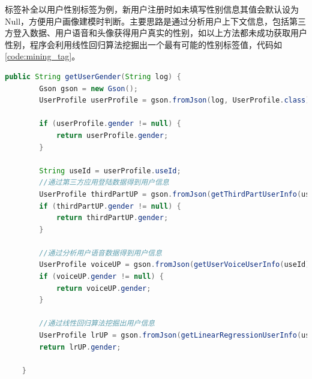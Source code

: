   标签补全以用户性别标签为例，新用户注册时如未填写性别信息其值会默认设为Null，方便用户画像建模时判断。主要思路是通过分析用户上下文信息，包括第三方登入数据、用户语音和头像获得用户真实的性别，如以上方法都未成功获取用户性别，程序会利用线性回归算法挖掘出一个最有可能的性别标签值，代码如\autoref{code:mining_tag}。
  \begin{lstlisting}[language=java,firstnumber=1,label={code:mining_tag}, caption={标签补全算法}]
    public String getUserGender(String log) {
        Gson gson = new Gson();
        UserProfile userProfile = gson.fromJson(log, UserProfile.class);

        if (userProfile.gender != null) {
            return userProfile.gender;
        }

        String useId = userProfile.useId;
        //通过第三方应用登陆数据得到用户信息
        UserProfile thirdPartUP = gson.fromJson(getThirdPartUserInfo(useId), UserProfile.class);
        if (thirdPartUP.gender != null) {
            return thirdPartUP.gender;
        }

        //通过分析用户语音数据得到用户信息
        UserProfile voiceUP = gson.fromJson(getUserVoiceUserInfo(useId), UserProfile.class);
        if (voiceUP.gender != null) {
            return voiceUP.gender;
        }

        //通过线性回归算法挖掘出用户信息
        UserProfile lrUP = gson.fromJson(getLinearRegressionUserInfo(useId), UserProfile.class);
        return lrUP.gender;

    }
  \end{lstlisting}

